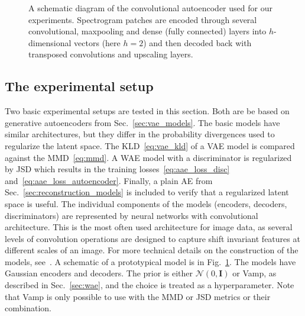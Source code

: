 \begin{figure}[ht]
\begin{center}
\end{center}
\caption{A schematic diagram of the convolutional autoencoder used for our experiments. Spectrogram patches are encoded through several convolutional\cite{lecun1989backpropagation}, maxpooling\cite{ranzato2007efficient} and dense (fully connected) layers into $h$-dimensional vectors (here $h=2$) and then decoded back with transposed convolutions and upscaling layers.}
\label{fig:ae}
\end{figure}

\subsection{The experimental setup}
Two basic experimental setups are tested in this section. Both are be based on generative autoencoders from Sec.~\ref{sec:vae_models}. The basic models have similar architectures, but they differ in the probability divergences used to regularize the latent space. The KLD~\eqref{eq:vae_kld} of a VAE model is compared against the MMD~\eqref{eq:mmd}. A WAE model with a discriminator is regularized by JSD which results in the training losses~\eqref{eq:aae_loss_disc} and~\eqref{eq:aae_loss_autoencoder}. Finally, a plain AE from Sec.~\ref{sec:reconstruction_models} is included to verify that a regularized latent space is useful. The individual components of the models (encoders, decoders, discriminators) are represented by neural networks with convolutional architecture. This is the most often used architecture for image data, as several levels of convolution operations are designed to capture shift invariant features at different scales of an image. For more technical details on the construction of the models, see~\cite{vskvara2020detection}. A schematic of a prototypical model is in Fig.~\ref{fig:ae}. The models have Gaussian encoders and decoders. The prior is either $\mathcal{N}(0,\mathbf{I})$ or Vamp, as described in Sec.~\ref{sec:wae}, and the choice is treated as a hyperparameter. Note that Vamp is only possible to use with the MMD or JSD metrics or their combination.

